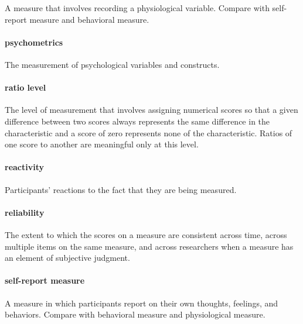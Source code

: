 \documentclass[
]{krantz}
\begin{document}
A measure that involves recording a physiological variable. Compare with self-report measure and behavioral measure.

\hypertarget{psychometrics}{%
\paragraph*{psychometrics}\label{psychometrics}}

The measurement of psychological variables and constructs.

\hypertarget{ratio-level}{%
\paragraph*{ratio level}\label{ratio-level}}

The level of measurement that involves assigning numerical scores so that a given difference between two scores always represents the same difference in the characteristic and a score of zero represents none of the characteristic. Ratios of one score to another are meaningful only at this level.

\hypertarget{reactivity}{%
\paragraph*{reactivity}\label{reactivity}}

Participants' reactions to the fact that they are being measured.

\hypertarget{reliability-1}{%
\paragraph*{reliability}\label{reliability-1}}

The extent to which the scores on a measure are consistent across time, across multiple items on the same measure, and across researchers when a measure has an element of subjective judgment.

\hypertarget{self-report-measure}{%
\paragraph*{self-report measure}\label{self-report-measure}}

A measure in which participants report on their own thoughts, feelings, and behaviors. Compare with behavioral measure and physiological measure.
\end{document}
